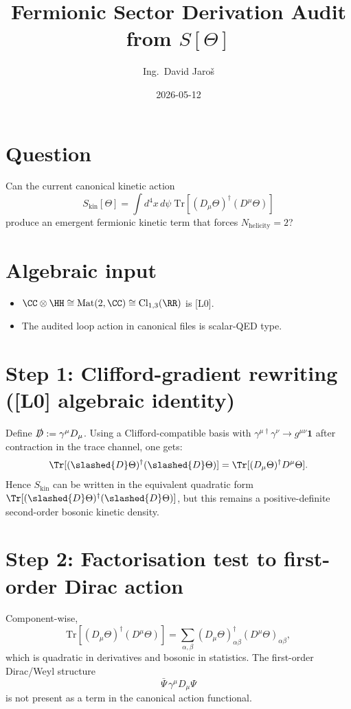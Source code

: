 \documentclass[12pt,a4paper]{article}
\title{Fermionic Sector Derivation Audit from $S[\Theta]$}
\author{Ing.\ David Jaroš}
\date{2026-05-12}
\begin{document}
\maketitle

\section{Question}
Can the current canonical kinetic action
\[
S_{\mathrm{kin}}[\Theta]
=\int d^4x\,d\psi\;\mathrm{Tr}\!\left[(D_\mu\Theta)^\dagger(D^\mu\Theta)\right]
\]
produce an emergent fermionic kinetic term that forces
$N_{\mathrm{helicity}}=2$?

\section{Algebraic input}
\begin{itemize}
  \item $\CC\otimes\HH \cong \mathrm{Mat}(2,\CC) \cong \mathrm{Cl}_{1,3}(\RR)$ is [L0].
  \item The audited loop action in canonical files is scalar-QED type.
\end{itemize}

\section{Step 1: Clifford-gradient rewriting (\textbf{[L0]} algebraic identity)}
Define \(\slashed{D}:=\gamma^\mu D_\mu\).  Using a Clifford-compatible basis with
\(
\gamma^{\mu\dagger}\gamma^\nu \to g^{\mu\nu}\mathbf{1}
\)
after contraction in the trace channel, one gets:
\[
\Tr[(\slashed{D}\Theta)^\dagger(\slashed{D}\Theta)]
=
\Tr[(D_\mu\Theta)^\dagger D^\mu\Theta].
\]
Hence \(S_{\mathrm{kin}}\) can be written in the equivalent quadratic form
\(
\Tr[(\slashed{D}\Theta)^\dagger(\slashed{D}\Theta)]
\),
but this remains a positive-definite second-order bosonic kinetic density.

\section{Step 2: Factorisation test to first-order Dirac action}
Component-wise,
\[
\mathrm{Tr}\!\left[(D_\mu\Theta)^\dagger(D^\mu\Theta)\right]
=\sum_{\alpha,\beta}
(D_\mu\Theta)^\dagger_{\alpha\beta}(D^\mu\Theta)_{\alpha\beta},
\]
which is quadratic in derivatives and bosonic in statistics.
The first-order Dirac/Weyl structure
\[
\bar\Psi\,\gamma^\mu D_\mu\Psi
\]
is not present as a term in the canonical action functional.
\end{document}
